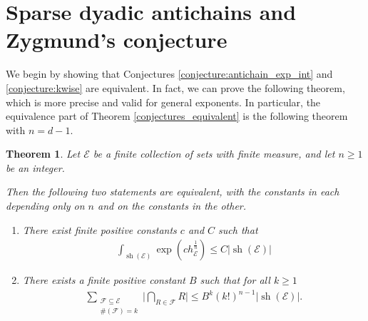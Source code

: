 \documentclass[oneside]{amsart}
\newtheorem{theorem}{Theorem}
\theoremstyle{definition}
\theoremstyle{plain}
\numberwithin{equation}{section}
\numberwithin{theorem}{section}
\newcommand{\sh}{\operatorname{sh}}
\begin{document}
\section{Sparse dyadic antichains and Zygmund's conjecture}
\label{sec:zygmund_reductions}

We begin by showing that Conjectures \ref{conjecture:antichain_exp_int} and
\ref{conjecture:kwise} are equivalent.
In fact, we can prove the following theorem, which is more precise and valid for
general exponents.
In particular, the equivalence part of Theorem \ref{conjectures_equivalent} is
the following theorem with $n = d-1$.
\begin{theorem}
  \label{equiv:theorem}
  Let $\mathcal{E}$ be a finite collection of sets with finite measure, and let
  $n \geq 1$ be an integer.

  Then the following two statements are equivalent, with the constants in each
  depending only on $n$ and on the constants in the other.
  \begin{enumerate}[label=(\alph*), ref=(\alph*)]
    \item \label{equiv:1}
      There exist finite positive constants $c$ and $C$  such that
      \begin{align*}
        \int_{\sh(\mathcal{E})} \exp(c h_{\mathcal{E}}^{\frac{1}{n}}) \leq
        C |\sh(\mathcal{E})|
      \end{align*}

    \item \label{equiv:2}
      There exists a finite positive constant $B$ such that for all $k \geq 1$
      \begin{align*}
        \sum_{\substack{\mathcal{F} \subseteq \mathcal{E} \\
        \#(\mathcal{F}) = k
        }} \Big|
        \bigcap_{R \in \mathcal{F}} R
        \Big|
        \leq B^k (k!)^{n-1} |\sh(\mathcal{E})|.
      \end{align*}
  \end{enumerate}
\end{theorem}
\end{document}
